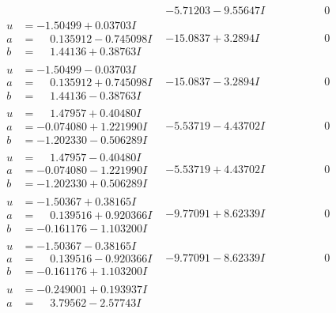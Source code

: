 \documentclass[1p]{elsarticle_modified}
\theoremstyle{definition}
\begin{document}
$$\begin{array}{c|c|c}
 & -5.71203 - 9.55647 I & \phantom{-0.000000 } 0 \\ \hline\begin{aligned}
u &= -1.50499 + 0.03703 I \\
a &= \phantom{-}0.135912 - 0.745098 I \\
b &= \phantom{-}1.44136 + 0.38763 I\end{aligned}
 & -15.0837 + 3.2894 I & \phantom{-0.000000 } 0 \\ \hline\begin{aligned}
u &= -1.50499 - 0.03703 I \\
a &= \phantom{-}0.135912 + 0.745098 I \\
b &= \phantom{-}1.44136 - 0.38763 I\end{aligned}
 & -15.0837 - 3.2894 I & \phantom{-0.000000 } 0 \\ \hline\begin{aligned}
u &= \phantom{-}1.47957 + 0.40480 I \\
a &= -0.074080 + 1.221990 I \\
b &= -1.202330 - 0.506289 I\end{aligned}
 & -5.53719 - 4.43702 I & \phantom{-0.000000 } 0 \\ \hline\begin{aligned}
u &= \phantom{-}1.47957 - 0.40480 I \\
a &= -0.074080 - 1.221990 I \\
b &= -1.202330 + 0.506289 I\end{aligned}
 & -5.53719 + 4.43702 I & \phantom{-0.000000 } 0 \\ \hline\begin{aligned}
u &= -1.50367 + 0.38165 I \\
a &= \phantom{-}0.139516 + 0.920366 I \\
b &= -0.161176 - 1.103200 I\end{aligned}
 & -9.77091 + 8.62339 I & \phantom{-0.000000 } 0 \\ \hline\begin{aligned}
u &= -1.50367 - 0.38165 I \\
a &= \phantom{-}0.139516 - 0.920366 I \\
b &= -0.161176 + 1.103200 I\end{aligned}
 & -9.77091 - 8.62339 I & \phantom{-0.000000 } 0 \\ \hline\begin{aligned}
u &= -0.249001 + 0.193937 I \\
a &= \phantom{-}3.79562 - 2.57743 I \\

\end{aligned}
\end{array}$$
\end{document}
